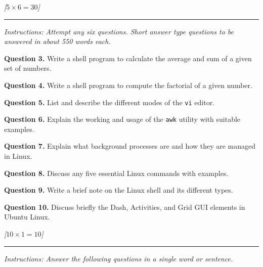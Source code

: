 \documentclass[11pt,a4paper]{article}
\newcommand{\pts}[1]{\hfill   \textit{[#1]}}
\begin{document}
\pts{$5  \times 6 = 30$}
\rule{\linewidth}{0.4pt}\smallskip




\noindent   \textit{Instructions: Attempt any six questions. Short answer type questions to be answered in about 550 words each.}

\medskip


\noindent   \textbf{Question 3.} Write a shell program to calculate the average and sum of a given set of numbers.

\medskip


\noindent   \textbf{Question 4.} Write a shell program to compute the factorial of a given number.

\medskip


\noindent   \textbf{Question 5.} List and describe the different modes of the   \texttt{vi} editor.

\medskip


\noindent   \textbf{Question 6.} Explain the working and usage of the   \texttt{awk} utility with suitable examples.

\medskip


\noindent   \textbf{Question 7.} Explain what background processes are and how they are managed in Linux.

\medskip


\noindent   \textbf{Question 8.} Discuss any five essential Linux commands with examples.

\medskip


\noindent   \textbf{Question 9.} Write a brief note on the Linux shell and its different types.

\medskip


\noindent   \textbf{Question 10.} Discuss briefly the Dash, Activities, and Grid GUI elements in Ubuntu Linux.

\bigskip


\pts{$10  \times 1 = 10$}
\rule{\linewidth}{0.4pt}\smallskip




\noindent   \textit{Instructions: Answer the following questions in a single word or sentence.}
\end{document}
